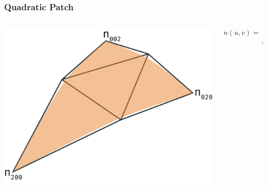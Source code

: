 \begin{frame}
	\frametitle{Quadratic Patch}
	\begin{columns}
		\begin{column}{0.5\textwidth}
			\includegraphics[width=\textwidth]{img/1_single/quadraticPatch.png}
		\end{column}
		\begin{column}{0.5\textwidth}
			\begin{equation*}
				n(u,v) = \sum\limits_{i+j+k=2} n_{ijk} u^i v^j w^k
			\end{equation*}
		\end{column}		
	\end{columns}
\end{frame}


